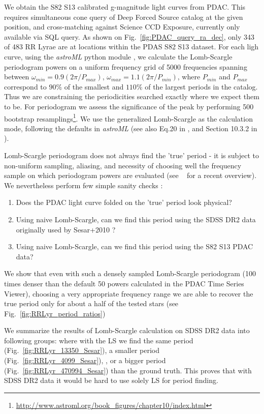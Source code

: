 \documentclass[DM,lsstdraft,toc,usenatbib]{lsstdoc}
\begin{document}
 We obtain the S82 S13 calibrated g-magnitude light curves from PDAC. This requires simultaneous cone query of Deep Forced Source catalog at the given position, and cross-matching against Science CCD Exposure, currently only available via SQL query.  As shown on Fig.~\ref{fig:PDAC_query_ra_dec}, only 343 of 483 RR Lyrae are at locations within the PDAS S82 S13 dataset. For each ligh curve, using the {\it astroML} python module \citep{astroML}, we calculate the Lomb-Scargle periodogram powers on a uniform frequency grid of 5000 frequencies spanning between $\omega_{min} = 0.9 ( 2 \pi / P_{max})$, $\omega_{max} = 1.1 ( 2 \pi / P_{min})$, where  $P_{min}$ and $P_{max}$ correspond to $90 \%$ of the smallest and $110\%$ of the largest periods in the catalog. Thus we are constraining the periodicities searched exactly where we expect them to be. For periodogram we assess  the significance of the peak by performing 500 bootstrap resamplings\footnote{\url{http://www.astroml.org/book\_figures/chapter10/index.html}}. We use the generalized Lomb-Scargle as the calculation  mode,  following the defaults in {\it astroML} (see also Eq.20 in \cite{zechmeister2009}, and Section 10.3.2 in \cite{ivezic2014}).   


Lomb-Scargle periodogram does not always find the 'true' period - it is subject to non-uniform sampling,  aliasing,  and necessity of choosing well the frequency sample on which periodogram powers are evaluated (see ~\cite{vanderplas2017} for a recent overview). We nevertheless perform few simple sanity checks : 
\begin{enumerate}
  \item  Does the PDAC light curve folded on the 'true' period look physical? 
  \item  Using naive Lomb-Scargle, can we find this period using the SDSS DR2 data originally used by Sesar+2010 ?  
  \item  Using naive Lomb-Scargle, can we find this period using the S82 S13 PDAC data?
\end{enumerate}


We show that even with such a densely sampled  Lomb-Scargle periodogram (100 times denser than the default 50 powers calculated in the PDAC Time Series Viewer), choosing a very appropriate frequency range we are able to recover the true period only for about a half of the tested stars (see Fig.~\ref{fig:RRLyr_period_ratios})

We summarize the results of Lomb-Scargle calculation on SDSS DR2 data into following groups: where with the LS we find the same period (Fig.~\ref{fig:RRLyr_13350_Sesar}), a smaller period (Fig.~\ref{fig:RRLyr_4099_Sesar}), , or a bigger period  (Fig.~\ref{fig:RRLyr_470994_Sesar}) than the ground truth. This proves that with SDSS DR2 data it would be hard to use solely LS for period finding. 
\end{document}
